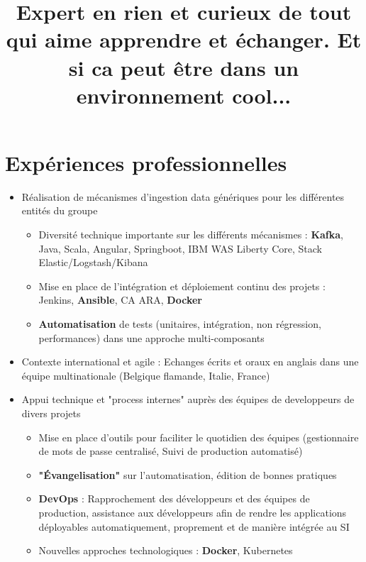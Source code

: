 \documentclass[10pt,a4paper]{moderncv}
\title{Expert en rien et curieux de tout qui aime \newline
apprendre et échanger. \newline 
Et si ca peut être dans un environnement cool...}
\begin{document}
\makecvtitle

\section{Expériences professionnelles}

{
\begin{itemize}
 \item Réalisation de mécanismes d'ingestion data génériques pour les différentes entités du groupe
  \begin{itemize}
   \item Diversité technique importante sur les différents mécanismes : \textbf{Kafka}, Java, Scala, Angular, Springboot, IBM WAS Liberty Core, Stack Elastic/Logstash/Kibana
   \item Mise en place de l'intégration et déploiement continu des projets : Jenkins, \textbf{Ansible}, CA ARA, \textbf{Docker}
   \item \textbf{Automatisation} de tests (unitaires, intégration, non régression, performances) dans une approche multi-composants
  \end{itemize}
 \item Contexte international et agile : Echanges écrits et oraux en anglais dans une équipe multinationale (Belgique flamande, Italie, France) 
\end{itemize}
}

{
\begin{itemize}
 \item Appui technique et "process internes" auprès des équipes de developpeurs de divers projets
  \begin{itemize}
   \item Mise en place d'outils pour faciliter le quotidien des équipes (gestionnaire de mots de passe centralisé, Suivi de production automatisé) 
   \item \textbf{"\'{E}vangelisation"} sur l'automatisation, édition de bonnes pratiques 
   \item \textbf{DevOps} : Rapprochement des développeurs et des équipes de production, assistance aux développeurs afin de rendre les applications déployables automatiquement, proprement et de manière intégrée au SI
   \item Nouvelles approches technologiques : \textbf{Docker}, Kubernetes
  \end{itemize}
\end{itemize}
}
\end{document}
